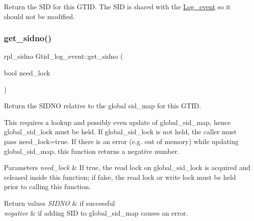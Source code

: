 Return the S\+ID for this G\+T\+ID. The S\+ID is shared with the \mbox{\hyperlink{classLog__event}{Log\+\_\+event}} so it should not be modified. \mbox{\label{classGtid__log__event_a0dfb533b61b71021ccf787b5be301a94}} 
\subsubsection{\texorpdfstring{get\+\_\+sidno()}{get\_sidno()}\hspace{0.1cm}{\footnotesize\ttfamily [1/2]}}
{\footnotesize\ttfamily rpl\+\_\+sidno Gtid\+\_\+log\+\_\+event\+::get\+\_\+sidno (\begin{DoxyParamCaption}\item[{bool}]{need\+\_\+lock }\end{DoxyParamCaption})\hspace{0.3cm}{\ttfamily [inline]}}

Return the S\+I\+D\+NO relative to the global sid\+\_\+map for this G\+T\+ID.

This requires a lookup and possibly even update of global\+\_\+sid\+\_\+map, hence global\+\_\+sid\+\_\+lock must be held. If global\+\_\+sid\+\_\+lock is not held, the caller must pass need\+\_\+lock=true. If there is an error (e.\+g. out of memory) while updating global\+\_\+sid\+\_\+map, this function returns a negative number.


\begin{DoxyParams}{Parameters}
{\em need\+\_\+lock} & If true, the read lock on global\+\_\+sid\+\_\+lock is acquired and released inside this function; if false, the read lock or write lock must be held prior to calling this function. \\
\hline
\end{DoxyParams}

\begin{DoxyRetVals}{Return values}
{\em S\+I\+D\+NO} & if successful \\
\hline
{\em negative} & if adding S\+ID to global\+\_\+sid\+\_\+map causes an error. \\
\hline
\end{DoxyRetVals}
\mbox{\label{classGtid__log__event_a7786bb44cd2aefec109e3bd09d705dcf}} 
